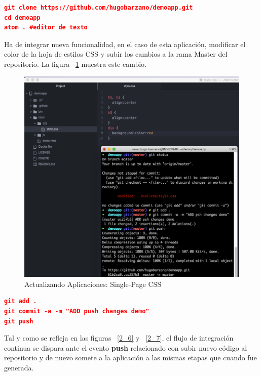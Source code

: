 \documentclass[a4paper,11pt]{book}
\begin{document}
\begin{lstlisting}[language=json,firstnumber=1]
git clone https://github.com/hugobarzano/demoapp.git
cd demoapp
atom . #editor de texto
\end{lstlisting}

 Ha de integrar nueva funcionalidad, en el caso de esta aplicación, modificar el color de la hoja de estilos CSS y  subir los cambios a la rama Master del repositorio. La figura ~\ref{2_5} muestra este cambio. 
 
 \begin{figure}[H]
\centering
\includegraphics[scale=0.4]{imagenes/casouso_a/2_5.png}
\caption{ Actualizando Aplicaciones: Single-Page CSS}
\label{2_5}
\end{figure}

 
 
\begin{lstlisting}[language=json,firstnumber=1]
git add .
git commit -a -m "ADD push changes demo"
git push
\end{lstlisting}


 
 Tal y como se refleja en las figuras  ~\ref{2_6} y  ~\ref{2_7},  el flujo de integración continua se dispara ante el evento \textbf{push} relacionado con subir nuevo código al repositorio y de nuevo somete a la aplicación a las mismas etapas que cuando fue generada.
 
\end{document}
